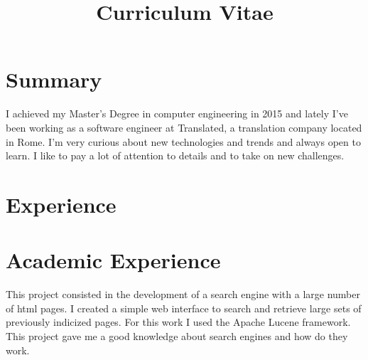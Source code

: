 \documentclass[11pt,a4paper,sans]{moderncv} %
\title{Curriculum Vitae}
\begin{document}
\makecvtitle %

\section{Summary}
I achieved my Master's Degree in computer engineering in 2015 and lately I've been working as a software engineer at Translated, a translation company located in Rome.
\newline{}
I'm very curious about new technologies and trends and always open to learn. I like to pay a lot of attention to details and to take on new challenges.


\section{Experience}



\section{Academic Experience}

{This project consisted in the development of a search engine with a large number of html pages. I created a simple web interface to search and retrieve large sets of previously indicized pages. For this work I used the Apache Lucene framework. This project gave me a good knowledge about search engines and how do they work.}
\end{document}
